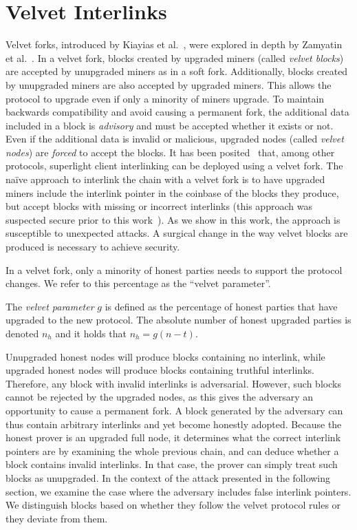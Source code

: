 \section{Velvet Interlinks}\label{sec:velvet}
Velvet forks, introduced by Kiayias et al.~\cite{nipopows},
were explored in depth by Zamyatin et al.~\cite{velvet}. In a
velvet fork, blocks created by upgraded miners (called \emph{velvet blocks}) are
accepted by unupgraded miners as in a soft fork. Additionally, blocks created by
unupgraded miners are also accepted by upgraded miners. This allows the protocol
to upgrade even if only a minority of miners upgrade. To maintain
backwards compatibility and avoid causing a permanent fork, the additional data included
in a block is \emph{advisory} and must be accepted whether it exists or not.
Even if the additional data is invalid or malicious, upgraded nodes
(called \emph{velvet nodes}) are \emph{forced} to accept the blocks.
It has been posited~\cite{nipopows,flyclient} that,
among other protocols, superlight client interlinking
can be deployed using a velvet fork.
The
na\"ive approach to interlink the chain with a velvet fork is to have
upgraded miners include the interlink pointer in the coinbase of the blocks they produce, but
accept blocks with missing or incorrect interlinks
(this approach was suspected secure prior to this work~\cite{nipopows,flyclient}).
As we show in this work, the approach is susceptible to unexpected attacks. A
surgical change in the way velvet blocks are produced is necessary to achieve
security.

In a velvet fork, only a minority of honest parties needs to support the protocol
changes. We refer to this percentage as the ``velvet parameter''.

\begin{definition}
	The \emph{velvet parameter} $g$ is defined as the percentage of honest parties
	that have upgraded to the new protocol. The absolute number of honest upgraded
	parties is denoted $n_h$ and it holds that
	$n_h = g (n - t)$.
	\label{defn:velvet_honest_majority}
\end{definition}

Unupgraded honest nodes will produce blocks
containing no interlink, while upgraded honest nodes will produce blocks
containing truthful interlinks. Therefore, any block with invalid interlinks is
adversarial. However, such blocks cannot be rejected by the
upgraded nodes, as this gives the adversary an opportunity to cause a permanent
fork. A block generated by the adversary can thus contain arbitrary interlinks
and yet become honestly adopted. Because the honest prover is an
upgraded full node, it determines what the correct interlink pointers are by
examining the whole previous chain, and can deduce whether a block contains
invalid interlinks. In that case, the prover can simply treat such blocks as
unupgraded. In the context of the attack presented in the following
section, we examine the case where the adversary includes false interlink
pointers. We distinguish blocks based on whether they follow the velvet protocol
rules or they deviate from them.

